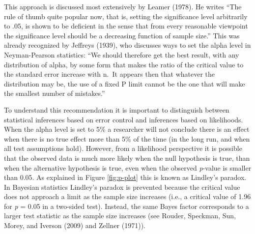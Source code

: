 \documentclass[,jou,floatsintext]{apa6}
\begin{document}
This approach is discussed most extensively by Leamer (1978). He writes \enquote{The rule of thumb quite popular now, that is, setting the significance level arbitrarily to .05, is shown to be deficient in the sense that from every reasonable viewpoint the significance level should be a decreasing function of sample size.} This was already recognized by Jeffreys (1939), who discusses ways to set the alpha level in Neyman-Pearson statistics: \enquote{We should therefore get the best result, with any distribution of alpha, by some form that makes the ratio of the critical value to the standard error increase with n.~It appears then that whatever the distribution may be, the use of a fixed P limit cannot be the one that will make the smallest number of mistakes.}

To understand this recommendation it is important to distinguish between statistical inferences based on error control and inferences based on likelihoods. When the alpha level is set to 5\% a researcher will not conclude there is an effect when there is no true effect more than 5\% of the time (in the long run, and when all test assumptions hold). However, from a likelihood perspective it is possible that the observed data is much more likely when the null hypothesis is true, than when the alternative hypothesis is true, even when the observed \emph{p}-value is smaller than 0.05. As explained in Figure \ref{fig:p-plot} this is known as Lindley's paradox. In Bayesian statistics Lindley's paradox is prevented because the critical value does not approach a limit as the sample size increases (i.e., a critical value of 1.96 for \emph{p} = 0.05 in a two-sided test). Instead, the same Bayes factor corresponds to a larger test statistic as the sample size increases (see Rouder, Speckman, Sun, Morey, and Iverson (2009) and Zellner (1971)).
\end{document}
